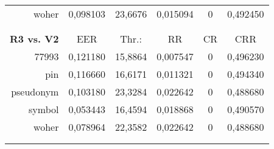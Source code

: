 \begin{table}[htbp]
\begin{tabular}{rrrrrr}
    woher & \multicolumn{1}{c}{0,098103} & \multicolumn{1}{c}{23,6676} & \multicolumn{1}{c}{0,015094} & \multicolumn{1}{c}{0} & \multicolumn{1}{c}{0,492450} \\
          &       &       &       &       &  \\
          &       &       &       &       &  \\
    \textbf{R3 vs. V2} & \multicolumn{1}{c}{EER} & \multicolumn{1}{c}{Thr.:} & \multicolumn{1}{c}{RR} & \multicolumn{1}{c}{CR} & \multicolumn{1}{c}{CRR} \\
    77993 & \multicolumn{1}{c}{0,121180} & \multicolumn{1}{c}{15,8864} & \multicolumn{1}{c}{0,007547} & \multicolumn{1}{c}{0} & \multicolumn{1}{c}{0,496230} \\
    pin   & \multicolumn{1}{c}{0,116660} & \multicolumn{1}{c}{16,6171} & \multicolumn{1}{c}{0,011321} & \multicolumn{1}{c}{0} & \multicolumn{1}{c}{0,494340} \\
    pseudonym & \multicolumn{1}{c}{0,103180} & \multicolumn{1}{c}{23,3284} & \multicolumn{1}{c}{0,022642} & \multicolumn{1}{c}{0} & \multicolumn{1}{c}{0,488680} \\
    symbol & \multicolumn{1}{c}{0,053443} & \multicolumn{1}{c}{16,4594} & \multicolumn{1}{c}{0,018868} & \multicolumn{1}{c}{0} & \multicolumn{1}{c}{0,490570} \\
    woher & \multicolumn{1}{c}{0,078964} & \multicolumn{1}{c}{22,3582} & \multicolumn{1}{c}{0,022642} & \multicolumn{1}{c}{0} & \multicolumn{1}{c}{0,488680} \\
          &       &       &       &       &  \\
          &       &       &       &       &  \\
    \bottomrule
    \end{tabular}%
  \label{tab:reverse}%
\end{table}%

